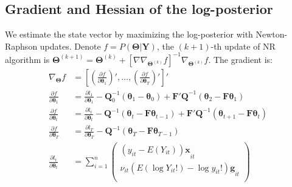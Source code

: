 \documentclass[]{article}
\begin{document}
\begin{appendices}
		\section{Gradient and Hessian of the log-posterior}\label{appC}
		We estimate the state vector by maximizing the log-posterior with Newton-Raphson updates. Denote $f = P(\bm{\Theta|Y})$, the $(k+1)$-th update of NR algorithm is $\bm{\Theta}^{(k+1)} = \bm{\Theta}^{(k)} + [\nabla\nabla_{\bm{\Theta}^{(k)}}f]^{-1}\nabla_{\bm{\Theta}^{(k)}}f$. 
		The gradient is:
		\begin{align}
			\nabla_{\bm{\Theta}}f &= \left[\left(\frac{\partial f}{\partial \bm{\theta}_1}\right)',\ldots,\left(\frac{\partial f}{\partial \bm{\theta}_T}\right)'\right]'\\
			\frac{\partial f}{\partial\bm{\theta}_1} &= \frac{\partial l_1}{\partial\bm{\theta}_1} -  \bm{Q}_0^{-1}(\bm{\theta}_1 - \bm{\theta}_0)   +  \bm{F'Q}^{-1}(\bm{\theta}_2 - \bm{F\theta}_{1}) \nonumber\\
			\frac{\partial f}{\partial\bm{\theta}_t} &= \frac{\partial l_t}{\partial\bm{\theta}_t} -  \bm{Q}^{-1}(\bm{\theta}_t - \bm{F\theta}_{t-1})   +  \bm{F'Q}^{-1}(\bm{\theta}_{t+1} - \bm{F\theta}_{t}) \nonumber\\
			\frac{\partial f}{\partial\bm{\theta}_T} &= \frac{\partial l_T}{\partial\bm{\theta}_T} -  \bm{Q}^{-1}(\bm{\theta}_T - \bm{F\theta}_{T-1})    \nonumber\\
			\frac{\partial l_t}{\partial\bm{\theta}_t} &= \sum_{i = 1}^{n}\begin{pmatrix}
				{\left( y_{it} - E\left( Y_{it} \right) \right)\bm{x}}_{it} \\
				{\nu_{it}\left( E\left( \log{Y_{it}!} \right) - \log{y_{it}!} \right)\bm{g}}_{it} \\
			\end{pmatrix} \nonumber
		\end{align}
		

\end{appendices}
\end{document}
